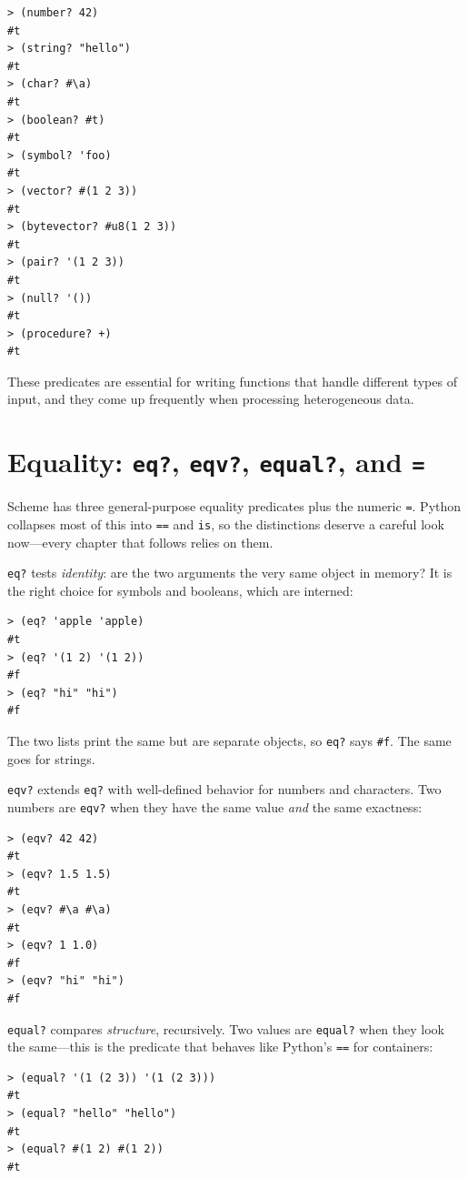 \begin{lstlisting}[style=repl]
> (number? 42)
#t
> (string? "hello")
#t
> (char? #\a)
#t
> (boolean? #t)
#t
> (symbol? 'foo)
#t
> (vector? #(1 2 3))
#t
> (bytevector? #u8(1 2 3))
#t
> (pair? '(1 2 3))
#t
> (null? '())
#t
> (procedure? +)
#t
\end{lstlisting}

These predicates are essential for writing functions that handle different types of input, and they come up frequently when processing heterogeneous data.

\section{Equality: \texttt{eq?}, \texttt{eqv?}, \texttt{equal?}, and \texttt{=}}
\label{sec:equality}

Scheme has three general-purpose equality predicates plus the numeric \texttt{=}. Python collapses most of this into \texttt{==} and \texttt{is}, so the distinctions deserve a careful look now---every chapter that follows relies on them.

\texttt{eq?} tests \emph{identity}: are the two arguments the very same object in memory? It is the right choice for symbols and booleans, which are interned:

\begin{lstlisting}[style=repl]
> (eq? 'apple 'apple)
#t
> (eq? '(1 2) '(1 2))
#f
> (eq? "hi" "hi")
#f
\end{lstlisting}

The two lists print the same but are separate objects, so \texttt{eq?} says \texttt{\#f}. The same goes for strings.

\texttt{eqv?} extends \texttt{eq?} with well-defined behavior for numbers and characters. Two numbers are \texttt{eqv?} when they have the same value \emph{and} the same exactness:

\begin{lstlisting}[style=repl]
> (eqv? 42 42)
#t
> (eqv? 1.5 1.5)
#t
> (eqv? #\a #\a)
#t
> (eqv? 1 1.0)
#f
> (eqv? "hi" "hi")
#f
\end{lstlisting}

\texttt{equal?} compares \emph{structure}, recursively. Two values are \texttt{equal?} when they look the same---this is the predicate that behaves like Python's \texttt{==} for containers:

\begin{lstlisting}[style=repl]
> (equal? '(1 (2 3)) '(1 (2 3)))
#t
> (equal? "hello" "hello")
#t
> (equal? #(1 2) #(1 2))
#t
\end{lstlisting}

